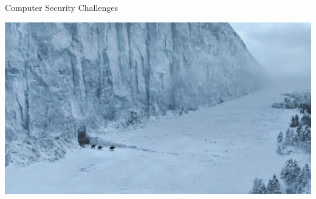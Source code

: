 \documentclass{beamer}
\begin{document}
\begin{frame}{Computer Security Challenges}
\begin{center}
  \includegraphics[width=0.9\linewidth]{thewall1}
\end{center}
\end{frame}

\end{document}
